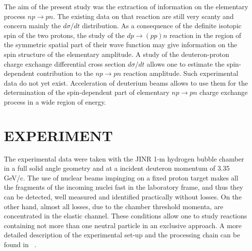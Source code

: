 The aim of the present study was the extraction of information on
 the elementary process $np\to pn$. The existing data on that reaction
are still very scanty and concern mainly the $d\sigma/dt$ distribution.
As a consequence of the definite isotopic spin of the two protons, the
study of the $dp\to (pp)n$ reaction in the region of the
symmetric spatial part of their wave function
may give information on the spin structure of the
 elementary amplitude. A study of the deuteron-proton charge exchange
 differential cross section $d\sigma/dt$
allows one to estimate  the spin-dependent contribution to the $np\to pn$
reaction amplitude. Such experimental data do not yet exist.
Acceleration of deuterium beams allows to use them for the determination
of the spin-dependent part of elementary $np\to pn$ charge exchange process
in a wide region of energy.


\section{EXPERIMENT}
The experimental data were taken with the JINR 1-m hydrogen bubble
chamber in a full solid angle geometry and at a incident deuteron momentum of
3.35 GeV/c. The use of nuclear
beams impinging on a fixed proton target makes all the fragments of the
incoming nuclei fast in the laboratory frame, and thus they can be detected,
well measured and identified practically without losses. On the other hand,
almost all losses, due to the chamber threshold momenta, are concentrated
in the elastic channel. These conditions
allow one to study  reactions containing not more than one
neutral particle in an exclusive approach. A more detailed description
of the experimental set-up and the processing chain can be found
in ~\cite{hbc}.

